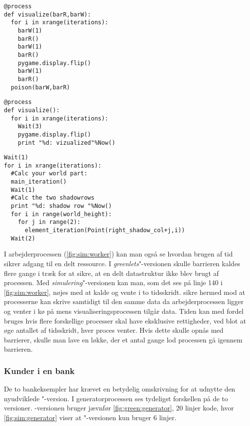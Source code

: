 \begin{lstlisting}[firstnumber=157 ,float=hbtp, label=fig:green:visualize, caption=\code{Greenlets}"-versionen af visualize]
@process
def visualize(barR,barW):
  for i in xrange(iterations):
    barW(1)
    barR()
    barW(1)
    barR()
    pygame.display.flip()
    barW(1)
    barR()
  poison(barW,barR)     
\end{lstlisting}
\begin{lstlisting}[firstnumber=144 ,float=hbtp, label=fig:sim:visualize, caption=\code{simulerings}"-versionen af visualize]
@process
def visualize():
  for i in xrange(iterations):
    Wait(3)  
    pygame.display.flip()
    print "%d: vizualized"%Now()
\end{lstlisting}
\begin{lstlisting}[firstnumber=130 ,float=hbtp, label=fig:sim:worker, caption=Uddrag af arbejderprocessen i simulering]
Wait(1)
for i in xrange(iterations):
  #Calc your world part:
  main_iteration()
  Wait(1)
  #Calc the two shadowrows
  print "%d: shadow row "%Now()
  for i in range(world_height):
    for j in range(2):
      element_iteration(Point(right_shadow_col+j,i))
  Wait(2)
\end{lstlisting}
I arbejderprocessen (\cref{fig:sim:worker}) kan man også se hvordan brugen af tid  sikrer adgang til en delt ressource. I  \emph{greenlets}"-versionen skulle barrieren  kaldes flere gange i træk for at sikre, at en delt datastruktur ikke blev brugt af processen. Med \emph{simulering}"-versionen kan man, som det ses på linje 140 i \cref{fig:sim:worker}, nøjes med at kalde  og vente i to tidsskridt. 
 sikre hermed mod at processerne kan skrive samtidigt til den samme data da arbejderprocessen ligger og venter i kø på  mens visualiseringsprocessen tilgår data. Tiden kan med fordel bruges hvis flere forskellige processer skal have eksklusive rettigheder, ved blot at øge antallet af tidsskridt, hver proces venter. Hvis dette skulle opnås med barrierer, skulle man lave en løkke, der et antal gange lod processen gå igennem barrieren.

\subsubsection{Kunder i en bank}
De to bankeksempler har krævet en betydelig omskrivning for at udnytte den nyudviklede "-version. I generatorprocessen ses tydeligst forskellen på de to versioner. -versionen bruger jævnfør \cref{fig:green:generator}, 20 linjer kode, hvor \cref{fig:sim:generator} viser at "-versionen kun bruger 6 linjer. 

